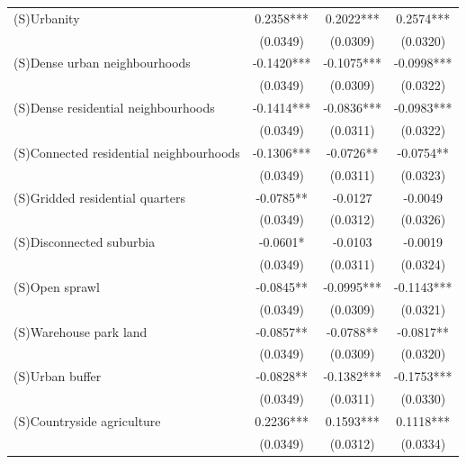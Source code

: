 \begin{table}
\begin{tabular}{lccc}
(S)Urbanity                                       &   0.2358*** &   0.2022*** &   0.2574*** \\
                                                  &    (0.0349) &    (0.0309) &    (0.0320) \\
(S)Dense urban neighbourhoods                     &  -0.1420*** &  -0.1075*** &  -0.0998*** \\
                                                  &    (0.0349) &    (0.0309) &    (0.0322) \\
(S)Dense residential neighbourhoods               &  -0.1414*** &  -0.0836*** &  -0.0983*** \\
                                                  &    (0.0349) &    (0.0311) &    (0.0322) \\
(S)Connected residential neighbourhoods           &  -0.1306*** &   -0.0726** &   -0.0754** \\
                                                  &    (0.0349) &    (0.0311) &    (0.0323) \\
(S)Gridded residential quarters                   &   -0.0785** &     -0.0127 &     -0.0049 \\
                                                  &    (0.0349) &    (0.0312) &    (0.0326) \\
(S)Disconnected suburbia                          &    -0.0601* &     -0.0103 &     -0.0019 \\
                                                  &    (0.0349) &    (0.0311) &    (0.0324) \\
(S)Open sprawl                                    &   -0.0845** &  -0.0995*** &  -0.1143*** \\
                                                  &    (0.0349) &    (0.0309) &    (0.0321) \\
(S)Warehouse park land                            &   -0.0857** &   -0.0788** &   -0.0817** \\
                                                  &    (0.0349) &    (0.0309) &    (0.0320) \\
(S)Urban buffer                                   &   -0.0828** &  -0.1382*** &  -0.1753*** \\
                                                  &    (0.0349) &    (0.0311) &    (0.0330) \\
(S)Countryside agriculture                        &   0.2236*** &   0.1593*** &   0.1118*** \\
                                                  &    (0.0349) &    (0.0312) &    (0.0334) \\

\end{tabular}
\end{table}
